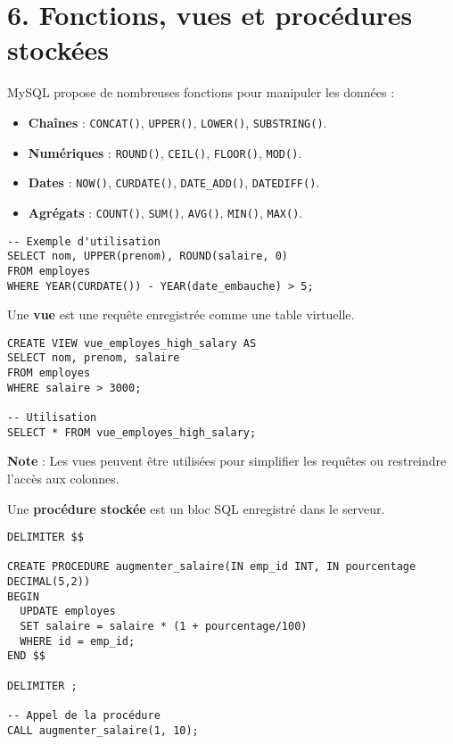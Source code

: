 \documentclass[a4paper,11pt]{article}
\begin{document}
\section*{6. Fonctions, vues et procédures stockées}

\begin{tcolorbox}[colback=blue!5!white,colframe=blue!75!black,title=Fonctions intégrées utiles]
MySQL propose de nombreuses fonctions pour manipuler les données :
\begin{itemize}
  \item \textbf{Chaînes} : \texttt{CONCAT()}, \texttt{UPPER()}, \texttt{LOWER()}, \texttt{SUBSTRING()}.
  \item \textbf{Numériques} : \texttt{ROUND()}, \texttt{CEIL()}, \texttt{FLOOR()}, \texttt{MOD()}.
  \item \textbf{Dates} : \texttt{NOW()}, \texttt{CURDATE()}, \texttt{DATE\_ADD()}, \texttt{DATEDIFF()}.
  \item \textbf{Agrégats} : \texttt{COUNT()}, \texttt{SUM()}, \texttt{AVG()}, \texttt{MIN()}, \texttt{MAX()}.
\end{itemize}

\begin{verbatim}
-- Exemple d'utilisation
SELECT nom, UPPER(prenom), ROUND(salaire, 0)
FROM employes
WHERE YEAR(CURDATE()) - YEAR(date_embauche) > 5;
\end{verbatim}
\end{tcolorbox}

\begin{tcolorbox}[colback=green!5!white,colframe=green!75!black,title=Créer une vue]
Une \textbf{vue} est une requête enregistrée comme une table virtuelle.

\begin{verbatim}
CREATE VIEW vue_employes_high_salary AS
SELECT nom, prenom, salaire
FROM employes
WHERE salaire > 3000;

-- Utilisation
SELECT * FROM vue_employes_high_salary;
\end{verbatim}

\textbf{Note} : Les vues peuvent être utilisées pour simplifier les requêtes ou restreindre l’accès aux colonnes.
\end{tcolorbox}

\begin{tcolorbox}[colback=yellow!5!white,colframe=yellow!75!black,title=Procédures stockées]
Une \textbf{procédure stockée} est un bloc SQL enregistré dans le serveur.

\begin{verbatim}
DELIMITER $$

CREATE PROCEDURE augmenter_salaire(IN emp_id INT, IN pourcentage DECIMAL(5,2))
BEGIN
  UPDATE employes
  SET salaire = salaire * (1 + pourcentage/100)
  WHERE id = emp_id;
END $$

DELIMITER ;

-- Appel de la procédure
CALL augmenter_salaire(1, 10);
\end{verbatim}
\end{tcolorbox}
\end{document}
